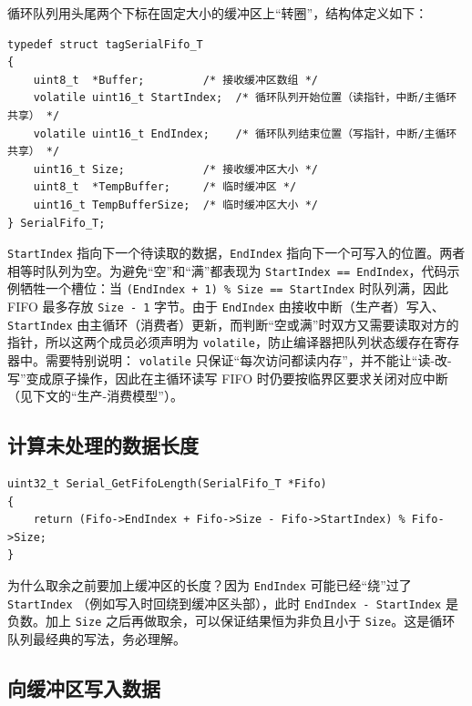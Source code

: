 循环队列用头尾两个下标在固定大小的缓冲区上“转圈”，结构体定义如下：

\begin{lstlisting}[style=c]
typedef struct tagSerialFifo_T
{
    uint8_t  *Buffer;         /* 接收缓冲区数组 */
    volatile uint16_t StartIndex;  /* 循环队列开始位置（读指针，中断/主循环共享） */
    volatile uint16_t EndIndex;    /* 循环队列结束位置（写指针，中断/主循环共享） */
    uint16_t Size;            /* 接收缓冲区大小 */
    uint8_t  *TempBuffer;     /* 临时缓冲区 */
    uint16_t TempBufferSize;  /* 临时缓冲区大小 */
} SerialFifo_T;
\end{lstlisting}

\texttt{StartIndex} 指向下一个待读取的数据，\texttt{EndIndex} 指向下一个可写入的位置。两者相等时队列为空。为避免“空”和“满”都表现为 \texttt{StartIndex == EndIndex}，代码示例牺牲一个槽位：当 \texttt{(EndIndex + 1) \% Size == StartIndex} 时队列满，因此 FIFO 最多存放 \texttt{Size - 1} 字节。由于 \texttt{EndIndex} 由接收中断（生产者）写入、 \texttt{StartIndex} 由主循环（消费者）更新，而判断“空或满”时双方又需要读取对方的指针，所以这两个成员必须声明为 \texttt{volatile}，防止编译器把队列状态缓存在寄存器中。需要特别说明： \texttt{volatile} 只保证“每次访问都读内存”，并不能让“读-改-写”变成原子操作，因此在主循环读写 FIFO 时仍要按临界区要求关闭对应中断（见下文的“生产-消费模型”）。

\subsection{计算未处理的数据长度}

\begin{lstlisting}[style=c]
uint32_t Serial_GetFifoLength(SerialFifo_T *Fifo)
{
    return (Fifo->EndIndex + Fifo->Size - Fifo->StartIndex) % Fifo->Size;
}
\end{lstlisting}

为什么取余之前要加上缓冲区的长度？因为 \texttt{EndIndex} 可能已经“绕”过了 \texttt{StartIndex} （例如写入时回绕到缓冲区头部），此时 \texttt{EndIndex - StartIndex} 是负数。加上 \texttt{Size} 之后再做取余，可以保证结果恒为非负且小于 \texttt{Size}。这是循环队列最经典的写法，务必理解。

\subsection{向缓冲区写入数据}

